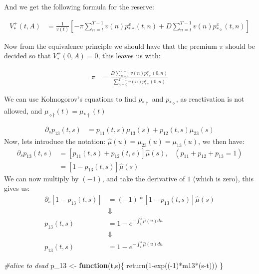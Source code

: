 \documentclass[
]{article}
\newenvironment{Shaded}{\begin{snugshade}}{\end{snugshade}}
\newcommand{\CommentTok}[1]{\textcolor[rgb]{0.56,0.35,0.01}{\textit{#1}}}
\newcommand{\ControlFlowTok}[1]{\textcolor[rgb]{0.13,0.29,0.53}{\textbf{#1}}}
\newcommand{\DecValTok}[1]{\textcolor[rgb]{0.00,0.00,0.81}{#1}}
\newcommand{\FunctionTok}[1]{\textcolor[rgb]{0.00,0.00,0.00}{#1}}
\newcommand{\NormalTok}[1]{#1}
\newcommand{\OtherTok}[1]{\textcolor[rgb]{0.56,0.35,0.01}{#1}}
\newcommand{\SpecialCharTok}[1]{\textcolor[rgb]{0.00,0.00,0.00}{#1}}
\begin{document}
And we get the following formula for the reserve:

\[\begin{aligned}
V_{*}^{+}(t,A) &=
\frac{1}{v(t)}\left[
-\pi\sum_{n=t}^{T-1}v(n)p_{**}^{x}(t,n) + D\sum_{n=t}^{T-1}v(n)p_{*\diamond}^{x}(t,n)
\right]
\end{aligned}\]

\newpage

Now from the equivalence principle we should have that the premium
\(\pi\) should be decided so that \(V_{*}^{+}(0,A) = 0\), this leaves us
with:

\[\begin{aligned}
\pi &= \frac{D\sum_{n=0}^{T-1}v(n)p_{*\diamond}^{x}(0,n)}{\sum_{n=0}^{T-1}v(n)p_{**}^{x}(0,n)}
\end{aligned}\]

We can use Kolmogorov's equations to find \(p_{*\dagger}\) and
\(p_{*\diamond}\), as reactivation is not allowed, and
\(\mu_{\diamond \dagger}(t) = \mu_{*\dagger}(t)\)

\[\begin{aligned}
\partial_{s}p_{13}(t,s) &= p_{11}(t,s)\mu_{13}(s) + p_{12}(t,s)\mu_{23}(s)
\end{aligned}\] Now, lets introduce the notation:
\(\hat{\mu}(u) = \mu_{23}(u) = \mu_{13}(u)\), we then have:
\[\begin{aligned}
\partial_{s}p_{13}(t,s) &= \left[p_{11}(t,s) + p_{12}(t,s)\right]\hat{\mu}(s), \;\;\; (p_{11} + p_{12} + p_{13} = 1) \\ 
&= \left[1 - p_{13}(t,s)\right]\hat{\mu}(s)
\end{aligned}\] We can now multiply by \((-1)\), and take the derivative
of \(1\) (which is zero), this gives us: \[\begin{aligned}
\partial_{s}[1-p_{13}(t,s)] &= (-1)*\left[1 - p_{13}(t,s)\right]\hat{\mu}(s) \\ 
&\Downarrow \\ 
p_{13}(t,s) &= 1 - e^{-\int_{t}^{s}\hat{\mu}(u)du} \\ 
&\Downarrow \\ 
p_{13}(t,s) &= 1 - e^{-\int_{t}^{s}\hat{\mu}(u)du} 
\end{aligned}\]

\begin{Shaded}
\begin{Highlighting}[]
\CommentTok{\#alive to dead}
\NormalTok{p\_13 }\OtherTok{\textless{}{-}} \ControlFlowTok{function}\NormalTok{(t,s)\{}
  \FunctionTok{return}\NormalTok{(}\DecValTok{1}\SpecialCharTok{{-}}\FunctionTok{exp}\NormalTok{((}\SpecialCharTok{{-}}\DecValTok{1}\NormalTok{)}\SpecialCharTok{*}\NormalTok{m13}\SpecialCharTok{*}\NormalTok{(s}\SpecialCharTok{{-}}\NormalTok{t)))}
\NormalTok{\}}
\end{Highlighting}
\end{Shaded}
\end{document}

